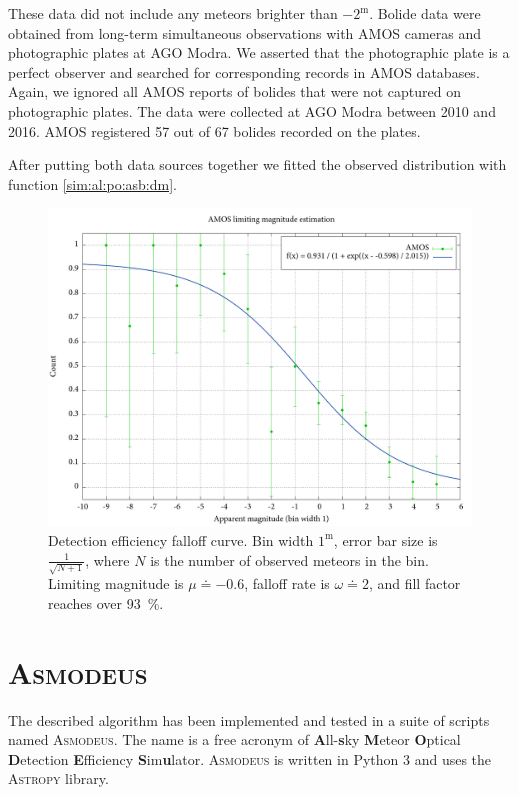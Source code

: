             These data did not include any meteors brighter than $-2^{\mathrm{m}}$.           
            Bolide data were obtained from long-term simultaneous observations with AMOS cameras and photographic
            plates at AGO Modra. We asserted that the photographic plate is a perfect observer and searched for corresponding
            records in AMOS databases. Again, we ignored all AMOS reports of bolides that were not captured on photographic plates.
            The data were collected at AGO Modra between 2010 and 2016. AMOS registered 57 out of 67 bolides recorded on
            the plates.

            After putting both data sources together we fitted the observed distribution with function \ref{sim:al:po:asb:dm}.
            
            \begin{figure}
                \includegraphics[width = \linewidth]{pictures/limmag.pdf}
                \caption{Detection efficiency falloff curve.
                    Bin width $1^\mathrm{m}$, error bar size is $\frac{1}{\sqrt{N + 1}}$, where $N$ is the number of observed meteors in the bin.
                    Limiting magnitude is $\mu \doteq \num{-0.6}$, falloff rate is $\omega \doteq \num{2}$, and fill factor reaches
                    over \SI{93}{\percent}.
                }
                \label{sim:al:po:limmag}
            \end{figure}

\section{\textsc{Asmodeus}}
    The described algorithm has been implemented and tested in a suite of scripts named \textsc{Asmodeus}.
    The name is a free acronym of \textbf{A}ll-\textbf{s}ky \textbf{M}eteor \textbf{O}ptical
    \textbf{D}etection \textbf{E}fficiency \textbf{S}im\textbf{u}lator.
    \textsc{Asmodeus} is written in Python 3 and uses the \textsc{Astropy} library.

